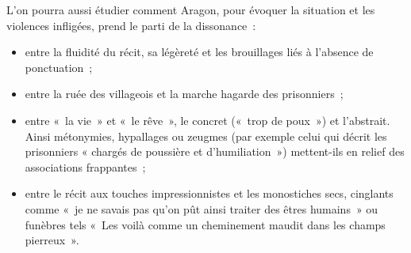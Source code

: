 {L'on pourra aussi étudier comment Aragon, pour évoquer la situation et les violences
infligées, prend le parti de la dissonance~:

\begin{itemize}
\item entre la fluidité du récit, sa légèreté et les brouillages liés à l'absence de ponctuation~;
\item entre la ruée des villageois et la marche hagarde des prisonniers~;
\item entre «~la vie~» et «~le rêve~», le concret («~trop de poux~») et l'abstrait. Ainsi
métonymies, hypallages ou zeugmes (par exemple celui qui décrit les prisonniers «
chargés de poussière et d'humiliation~») mettent-ils en relief des associations
frappantes~;
\item entre le récit aux touches impressionnistes et les monostiches secs, cinglants comme
«~je ne savais pas qu'on pût ainsi traiter des êtres humains~» ou funèbres tels «~Les
voilà comme un cheminement maudit dans les champs pierreux~».
\end{itemize}}%
